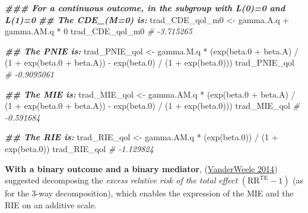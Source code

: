 \documentclass[
]{book}
\newenvironment{Shaded}{\begin{snugshade}}{\end{snugshade}}
\newcommand{\CommentTok}[1]{\textcolor[rgb]{0.56,0.35,0.01}{\textit{#1}}}
\newcommand{\DecValTok}[1]{\textcolor[rgb]{0.00,0.00,0.81}{#1}}
\newcommand{\DocumentationTok}[1]{\textcolor[rgb]{0.56,0.35,0.01}{\textbf{\textit{#1}}}}
\newcommand{\FloatTok}[1]{\textcolor[rgb]{0.00,0.00,0.81}{#1}}
\newcommand{\FunctionTok}[1]{\textcolor[rgb]{0.00,0.00,0.00}{#1}}
\newcommand{\NormalTok}[1]{#1}
\newcommand{\OtherTok}[1]{\textcolor[rgb]{0.56,0.35,0.01}{#1}}
\newcommand{\SpecialCharTok}[1]{\textcolor[rgb]{0.00,0.00,0.00}{#1}}
\begin{document}
\begin{Shaded}
\begin{Highlighting}[]
\DocumentationTok{\#\#\# For a continuous outcome, in the subgroup with L(0)=0 and L(1)=0}
\DocumentationTok{\#\# The CDE\_(M=0) is:}
\NormalTok{trad\_CDE\_qol\_m0 }\OtherTok{\textless{}{-}}\NormalTok{ gamma.A.q }\SpecialCharTok{+}\NormalTok{ gamma.AM.q }\SpecialCharTok{*} \DecValTok{0}
\NormalTok{trad\_CDE\_qol\_m0}
\CommentTok{\# {-}3.715265}

\DocumentationTok{\#\# The PNIE is:}
\NormalTok{trad\_PNIE\_qol }\OtherTok{\textless{}{-}}\NormalTok{ gamma.M.q }\SpecialCharTok{*}
\NormalTok{  (}\FunctionTok{exp}\NormalTok{(beta}\FloatTok{.0} \SpecialCharTok{+}\NormalTok{ beta.A) }\SpecialCharTok{/}
\NormalTok{     (}\DecValTok{1} \SpecialCharTok{+} \FunctionTok{exp}\NormalTok{(beta}\FloatTok{.0} \SpecialCharTok{+}\NormalTok{ beta.A)) }\SpecialCharTok{{-}} \FunctionTok{exp}\NormalTok{(beta}\FloatTok{.0}\NormalTok{) }\SpecialCharTok{/}\NormalTok{ (}\DecValTok{1} \SpecialCharTok{+} \FunctionTok{exp}\NormalTok{(beta}\FloatTok{.0}\NormalTok{)))}
\NormalTok{trad\_PNIE\_qol}
\CommentTok{\# {-}0.9095061}

\DocumentationTok{\#\# The MIE is:}
\NormalTok{trad\_MIE\_qol }\OtherTok{\textless{}{-}}\NormalTok{ gamma.AM.q }\SpecialCharTok{*}
\NormalTok{  (}\FunctionTok{exp}\NormalTok{(beta}\FloatTok{.0} \SpecialCharTok{+}\NormalTok{ beta.A) }\SpecialCharTok{/}\NormalTok{ (}\DecValTok{1} \SpecialCharTok{+} \FunctionTok{exp}\NormalTok{(beta}\FloatTok{.0} \SpecialCharTok{+}\NormalTok{ beta.A)) }\SpecialCharTok{{-}}
     \FunctionTok{exp}\NormalTok{(beta}\FloatTok{.0}\NormalTok{) }\SpecialCharTok{/}\NormalTok{ (}\DecValTok{1} \SpecialCharTok{+} \FunctionTok{exp}\NormalTok{(beta}\FloatTok{.0}\NormalTok{)))}
\NormalTok{trad\_MIE\_qol}
\CommentTok{\# {-}0.591684}

\DocumentationTok{\#\# The RIE is:}
\NormalTok{trad\_RIE\_qol }\OtherTok{\textless{}{-}}\NormalTok{ gamma.AM.q }\SpecialCharTok{*}\NormalTok{ (}\FunctionTok{exp}\NormalTok{(beta}\FloatTok{.0}\NormalTok{)) }\SpecialCharTok{/}\NormalTok{ (}\DecValTok{1} \SpecialCharTok{+} \FunctionTok{exp}\NormalTok{(beta}\FloatTok{.0}\NormalTok{))}
\NormalTok{trad\_RIE\_qol}
\CommentTok{\# {-}1.129824}
\end{Highlighting}
\end{Shaded}

\textbf{With a binary outcome and a binary mediator}, (\protect\hyperlink{ref-vanderweele2014}{VanderWeele 2014}) suggested decomposing the \emph{excess relative risk of the total effect} \((\text{RR}^{\text{TE}}-1)\) (as for the 3-way decomposition), which enables the expression of the MIE and the RIE on an additive scale.
\end{document}
